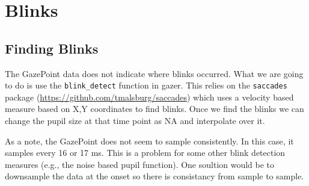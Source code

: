 \documentclass[
]{article}
\begin{document}
\hypertarget{blinks}{%
\section{Blinks}\label{blinks}}

\hypertarget{finding-blinks}{%
\subsection{Finding Blinks}\label{finding-blinks}}

The GazePoint data does not indicate where blinks occurred. What we are
going to do is use the \texttt{blink\_detect} function in gazer. This
relies on the \texttt{saccades} package
(\url{https://github.com/tmalsburg/saccades}) which uses a velocity
based measure based on X,Y coordinates to find blinks. Once we find the
blinks we can change the pupil size at that time point as NA and
interpolate over it.

As a note, the GazePoint does not seem to sample consistently. In this
case, it samples every 16 or 17 ms. This is a problem for some other
blink detection measures (e.g., the noise based pupil function). One
soultion would be to downsample the data at the onset so there is
consistancy from sample to sample.
\end{document}

